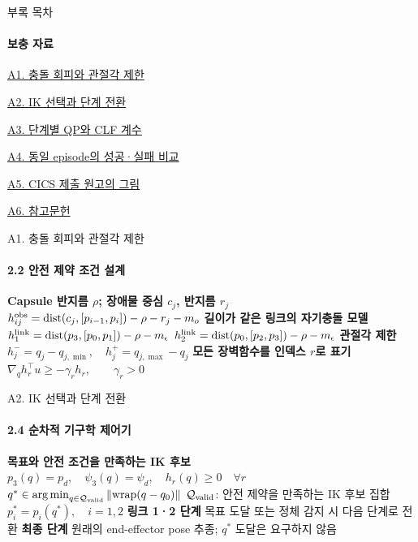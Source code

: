 \documentclass[t,10pt,handout]{beamer}
\newcommand{\norm}[1]{\left\lVert#1\right\rVert}
\DeclareMathOperator*{\argmin}{arg\,min}
\begin{document}
\appendix
\begin{frame}[label=appendix-contents]{부록 목차}
  \framesubtitle{보충 자료}
  \hypertarget{appendix-contents}{}
  \begin{slidebody}\vfill
    \hyperlink{app-safety}{A1. 충돌 회피와 관절각 제한}\par\vfill
    \hyperlink{app-ik}{A2. IK 선택과 단계 전환}\par\vfill
    \hyperlink{app-qp}{A3. 단계별 QP와 CLF 계수}\par\vfill
    \hyperlink{app-evidence}{A4. 동일 episode의 성공·실패 비교}\par\vfill
    \hyperlink{app-paper}{A5. CICS 제출 원고의 그림}\par\vfill
    \hyperlink{app-refs}{A6. 참고문헌}\par\vfill
  \end{slidebody}\end{frame}

\begin{frame}[label=app-safety]{A1. 충돌 회피와 관절각 제한}
  \framesubtitle{2.2 안전 제약 조건 설계}
  \begin{slidebody}\centering
    \textbf{Capsule 반지름 $\rho$; 장애물 중심 $c_j$, 반지름 $r_j$}\detailgap
    $h_{ij}^{\rm obs}=\operatorname{dist}(c_j,[p_{i-1},p_i])-\rho-r_j-m_o$\groupgap
    \textbf{길이가 같은 링크의 자기충돌 모델}\detailgap
    $h_1^{\rm link}=\operatorname{dist}(p_3,[p_0,p_1])-\rho-m_\epsilon$\detailgap
    $h_2^{\rm link}=\operatorname{dist}(p_0,[p_2,p_3])-\rho-m_\epsilon$\groupgap
    \textbf{관절각 제한}\detailgap
    $h_j^-=q_j-q_{j,\min},\quad h_j^+=q_{j,\max}-q_j$\groupgap
    \textbf{모든 장벽함수를 인덱스 $r$로 표기}\detailgap
    $\nabla_qh_r^\top u\geq-\gamma_rh_r,\qquad\gamma_r>0$\par
  \end{slidebody}\end{frame}

\begin{frame}[label=app-ik]{A2. IK 선택과 단계 전환}
  \framesubtitle{2.4 순차적 기구학 제어기}
  \begin{slidebody}\centering
    \textbf{목표와 안전 조건을 만족하는 IK 후보}\detailgap
    $p_3(q)=p_d,\quad\psi_3(q)=\psi_d,\quad h_r(q)\geq0\quad\forall r$\groupgap
    $q^*\in\argmin_{q\in\mathcal Q_{\rm valid}}\norm{\operatorname{wrap}(q-q_0)}$\detailgap
    $\mathcal Q_{\rm valid}$: 안전 제약을 만족하는 IK 후보 집합\groupgap
    $p_i^*=p_i(q^*),\quad i=1,2$\groupgap
    \textbf{링크 1·2 단계}\detailgap
    목표 도달 또는 정체 감지 시 다음 단계로 전환\groupgap
    \textbf{최종 단계}\detailgap
    원래의 end-effector pose 추종; $q^*$ 도달은 요구하지 않음\par
  \end{slidebody}\end{frame}
\end{document}
